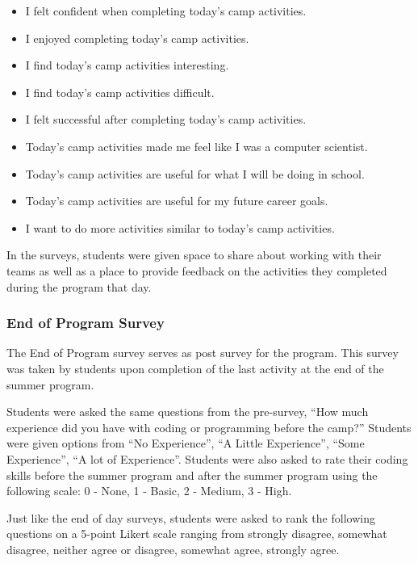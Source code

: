 \documentclass[
]{article}
\providecommand{\tightlist}{%
  \setlength{\itemsep}{0pt}\setlength{\parskip}{0pt}}
\begin{document}
\begin{itemize}
\tightlist
\item
  I felt confident when completing today's camp activities.
\item
  I enjoyed completing today's camp activities.
\item
  I find today's camp activities interesting.
\item
  I find today's camp activities difficult.
\item
  I felt successful after completing today's camp activities.
\item
  Today's camp activities made me feel like I was a computer scientist.
\item
  Today's camp activities are useful for what I will be doing in school.
\item
  Today's camp activities are useful for my future career goals.
\item
  I want to do more activities similar to today's camp activities.
\end{itemize}

In the surveys, students were given space to share about working with
their teams as well as a place to provide feedback on the activities
they completed during the program that day.

\hypertarget{end-of-program-survey}{%
\subsubsection{End of Program Survey}\label{end-of-program-survey}}

The End of Program survey serves as post survey for the program. This
survey was taken by students upon completion of the last activity at the
end of the summer program.

Students were asked the same questions from the pre-survey, ``How much
experience did you have with coding or programming before the camp?''
Students were given options from ``No Experience'', ``A Little
Experience'', ``Some Experience'', ``A lot of Experience''. Students
were also asked to rate their coding skills before the summer program
and after the summer program using the following scale: 0 - None, 1 -
Basic, 2 - Medium, 3 - High.

Just like the end of day surveys, students were asked to rank the
following questions on a 5-point Likert scale ranging from strongly
disagree, somewhat disagree, neither agree or disagree, somewhat agree,
strongly agree.
\end{document}
